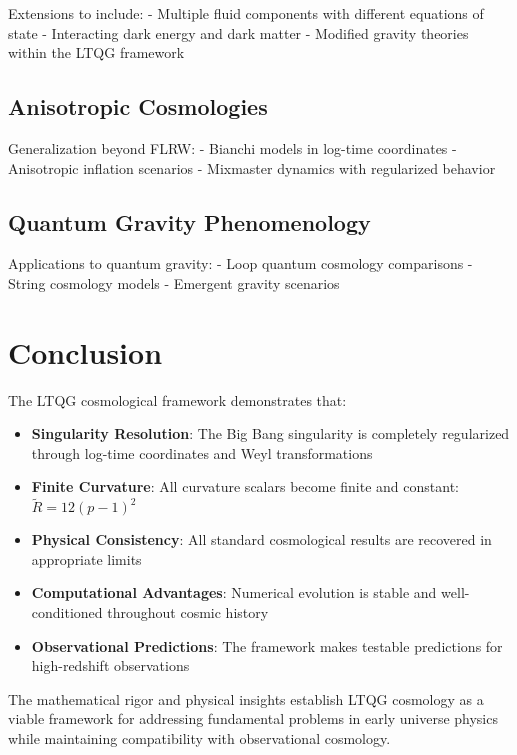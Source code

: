 \documentclass[11pt,a4paper]{article}
\begin{document}
Extensions to include:
- Multiple fluid components with different equations of state
- Interacting dark energy and dark matter
- Modified gravity theories within the LTQG framework

\subsection{Anisotropic Cosmologies}

Generalization beyond FLRW:
- Bianchi models in log-time coordinates
- Anisotropic inflation scenarios
- Mixmaster dynamics with regularized behavior

\subsection{Quantum Gravity Phenomenology}

Applications to quantum gravity:
- Loop quantum cosmology comparisons
- String cosmology models
- Emergent gravity scenarios

\section{Conclusion}

The LTQG cosmological framework demonstrates that:

\begin{itemize}
\item \textbf{Singularity Resolution}: The Big Bang singularity is completely regularized through log-time coordinates and Weyl transformations

\item \textbf{Finite Curvature}: All curvature scalars become finite and constant: $\tilde{R} = 12(p-1)^2$

\item \textbf{Physical Consistency}: All standard cosmological results are recovered in appropriate limits

\item \textbf{Computational Advantages}: Numerical evolution is stable and well-conditioned throughout cosmic history

\item \textbf{Observational Predictions}: The framework makes testable predictions for high-redshift observations
\end{itemize}

The mathematical rigor and physical insights establish LTQG cosmology as a viable framework for addressing fundamental problems in early universe physics while maintaining compatibility with observational cosmology.
\end{document}
